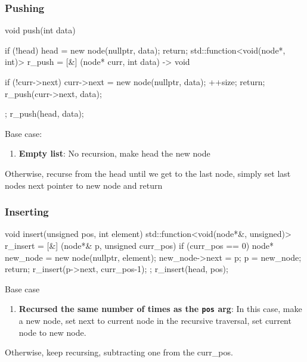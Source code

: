 \documentclass{report}
\begin{document}
\pagebreak 
\subsubsection{Pushing}
\bigbreak \noindent 
\begin{cppcode}
    void push(int data) {
        if (!head) {
            head = new node(nullptr, data);
            return;
        }
        std::function<void(node*, int)> r_push = [&] (node* curr, int data) -> void {

            if (!curr->next) {
                curr->next = new node(nullptr, data);
                ++size;
                return;
            }
            r_push(curr->next, data);
        };
        r_push(head, data);
    }
\end{cppcode}
\bigbreak \noindent 
Base case:
\begin{enumerate}
    \item \textbf{Empty list}: No recursion, make head the new node
\end{enumerate}
\bigbreak \noindent 
Otherwise, recurse from the head until we get to the last node, simply set last nodes next pointer to new node and return

\pagebreak 
\subsubsection{Inserting}
\bigbreak \noindent 
\begin{cppcode}
    void insert(unsigned pos, int element) {
        std::function<void(node*&, unsigned)> r_insert = [&] (node*& p, unsigned curr_pos) {
            if (curr_pos == 0) {
                node* new_node = new node(nullptr, element);
                new_node->next = p;
                p = new_node;
                return;
            }
            r_insert(p->next,  curr_pos-1);
        };
        r_insert(head, pos);
    }
\end{cppcode}
\bigbreak \noindent 
Base case
\begin{enumerate}
    \item \textbf{Recursed the same number of times as the \texttt{pos} arg}: In this case, make a new node, set next to current node in the recursive traversal, set current node to new node.
\end{enumerate}
\bigbreak \noindent 
Otherwise, keep recursing, subtracting one from the curr\_pos.

\pagebreak 
\end{document}
